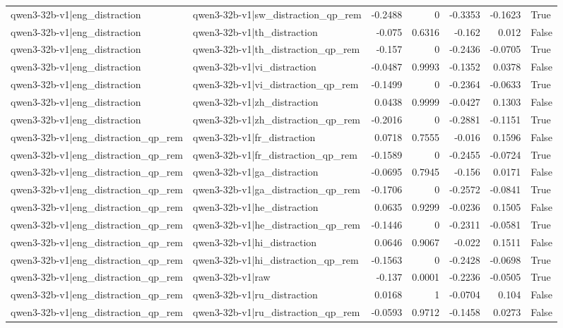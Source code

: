 \begin{table}
\begin{tabular}{l l r r r r l}
qwen3-32b-v1|eng_distraction & qwen3-32b-v1|sw_distraction_qp_rem & -0.2488 & 0 & -0.3353 & -0.1623 & True \\
qwen3-32b-v1|eng_distraction & qwen3-32b-v1|th_distraction & -0.075 & 0.6316 & -0.162 & 0.012 & False \\
qwen3-32b-v1|eng_distraction & qwen3-32b-v1|th_distraction_qp_rem & -0.157 & 0 & -0.2436 & -0.0705 & True \\
qwen3-32b-v1|eng_distraction & qwen3-32b-v1|vi_distraction & -0.0487 & 0.9993 & -0.1352 & 0.0378 & False \\
qwen3-32b-v1|eng_distraction & qwen3-32b-v1|vi_distraction_qp_rem & -0.1499 & 0 & -0.2364 & -0.0633 & True \\
qwen3-32b-v1|eng_distraction & qwen3-32b-v1|zh_distraction & 0.0438 & 0.9999 & -0.0427 & 0.1303 & False \\
qwen3-32b-v1|eng_distraction & qwen3-32b-v1|zh_distraction_qp_rem & -0.2016 & 0 & -0.2881 & -0.1151 & True \\
qwen3-32b-v1|eng_distraction_qp_rem & qwen3-32b-v1|fr_distraction & 0.0718 & 0.7555 & -0.016 & 0.1596 & False \\
qwen3-32b-v1|eng_distraction_qp_rem & qwen3-32b-v1|fr_distraction_qp_rem & -0.1589 & 0 & -0.2455 & -0.0724 & True \\
qwen3-32b-v1|eng_distraction_qp_rem & qwen3-32b-v1|ga_distraction & -0.0695 & 0.7945 & -0.156 & 0.0171 & False \\
qwen3-32b-v1|eng_distraction_qp_rem & qwen3-32b-v1|ga_distraction_qp_rem & -0.1706 & 0 & -0.2572 & -0.0841 & True \\
qwen3-32b-v1|eng_distraction_qp_rem & qwen3-32b-v1|he_distraction & 0.0635 & 0.9299 & -0.0236 & 0.1505 & False \\
qwen3-32b-v1|eng_distraction_qp_rem & qwen3-32b-v1|he_distraction_qp_rem & -0.1446 & 0 & -0.2311 & -0.0581 & True \\
qwen3-32b-v1|eng_distraction_qp_rem & qwen3-32b-v1|hi_distraction & 0.0646 & 0.9067 & -0.022 & 0.1511 & False \\
qwen3-32b-v1|eng_distraction_qp_rem & qwen3-32b-v1|hi_distraction_qp_rem & -0.1563 & 0 & -0.2428 & -0.0698 & True \\
qwen3-32b-v1|eng_distraction_qp_rem & qwen3-32b-v1|raw & -0.137 & 0.0001 & -0.2236 & -0.0505 & True \\
qwen3-32b-v1|eng_distraction_qp_rem & qwen3-32b-v1|ru_distraction & 0.0168 & 1 & -0.0704 & 0.104 & False \\
qwen3-32b-v1|eng_distraction_qp_rem & qwen3-32b-v1|ru_distraction_qp_rem & -0.0593 & 0.9712 & -0.1458 & 0.0273 & False \\

\end{tabular}
\end{table}
